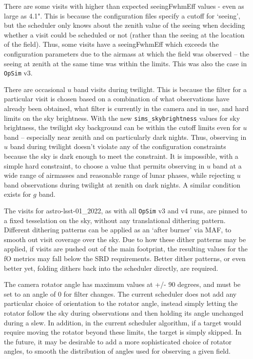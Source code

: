 \documentclass[DM,lsstdraft,authoryear,toc]{lsstdoc}
\newcommand{\opsim}{\texttt{OpSim}\xspace}
\newcommand{\simsky}{\texttt{sims\_skybrightness}\xspace}
\begin{document}
There are some visits with higher than expected seeingFwhmEff values - even as large as 4.1". This is because the configuration files specify a cutoff for `seeing', but the scheduler only knows about the zenith value of the seeing when deciding whether a visit could be scheduled or not (rather than the seeing at the location of the field). Thus, some visits have a seeingFwhmEff which exceeds the configuration parameters due to the airmass at which the field was observed -- the seeing at zenith at the same time was within the limits. This was also the case in \opsim v3. 

There are occasional $u$ band visits during twilight. This is because the filter for a particular visit is chosen based on a combination of what observations have already been obtained, what filter is currently in the camera and in use, and hard limits on the sky brightness. With the new \simsky values for sky brightness, the twilight sky background can be within the cutoff limits even for $u$ band -- especially near zenith and on particularly dark nights. Thus, observing in $u$ band during twilight doesn't violate any of the configuration constraints because the sky is dark enough to meet the constraint. It is impossible, with a simple hard constraint, to choose a value that permits observing in $u$ band at a wide range of airmasses and reasonable range of lunar phases, while rejecting $u$ band observations during twilight at zenith on dark nights. A similar condition exists for $g$ band.

The visits for astro-lsst-01\_2022, as with all \opsim v3 and v4 runs, are pinned to a fixed tesselation on the sky, without any translational dithering pattern. Different dithering patterns can be applied as an `after burner' via MAF, to smooth out visit coverage over the sky. Due to how these dither patterns may be applied, if visits are pushed out of the main footprint, the resulting values for the fO metrics may fall below the SRD requirements. Better dither patterns, or even better yet, folding dithers back into the scheduler directly, are required.

The camera rotator angle has maximum values at +/- 90 degrees, and must be set to an angle of 0 for filter changes. The current scheduler does not add any particular choice of orientation to the rotator angle, instead simply letting the rotator follow the sky during observations and then holding its angle unchanged during a slew. In addition, in the current scheduler algorithm, if a target would require moving the rotator beyond these limits, the target is simply skipped. In the future, it may be desirable to add a more sophisticated choice of rotator angles, to smooth the distribution of angles used for observing a given field.
\end{document}

